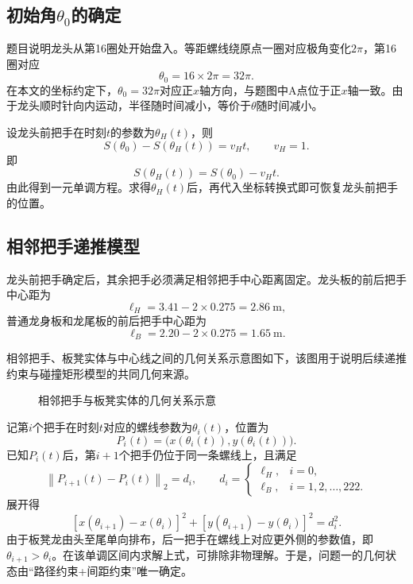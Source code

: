 \subsection{初始角$\theta_0$的确定}
题目说明龙头从第16圈处开始盘入。等距螺线绕原点一圈对应极角变化$2\pi$，第16圈对应
\[
\theta_0=16\times2\pi=32\pi.
\]
在本文的坐标约定下，$\theta_0=32\pi$对应正$x$轴方向，与题图中A点位于正$x$轴一致。由于龙头顺时针向内运动，半径随时间减小，等价于$\theta$随时间减小。

设龙头前把手在时刻$t$的参数为$\theta_H(t)$，则
\[
S(\theta_0)-S\!\left(\theta_H(t)\right)=v_H t,\qquad v_H=1.
\]
即
\[
S\!\left(\theta_H(t)\right)=S(\theta_0)-v_H t.
\]
由此得到一元单调方程。求得$\theta_H(t)$后，再代入坐标转换式即可恢复龙头前把手的位置。

\subsection{相邻把手递推模型}
龙头前把手确定后，其余把手必须满足相邻把手中心距离固定。龙头板的前后把手中心距为
\[
\ell_H=3.41-2\times0.275=2.86\ \text{m},
\]
普通龙身板和龙尾板的前后把手中心距为
\[
\ell_B=2.20-2\times0.275=1.65\ \text{m}.
\]

相邻把手、板凳实体与中心线之间的几何关系示意图如下，该图用于说明后续递推约束与碰撞矩形模型的共同几何来源。

\begin{figure}[H]
\centering
{}
\caption{相邻把手与板凳实体的几何关系示意}
\label{fig:q1-bench-geometry}
\end{figure}

记第$i$个把手在时刻$t$对应的螺线参数为$\theta_i(t)$，位置为
\[
P_i(t)=\bigl(x(\theta_i(t)),y(\theta_i(t))\bigr).
\]
已知$P_i(t)$后，第$i+1$个把手仍位于同一条螺线上，且满足
\[
\left\|P_{i+1}(t)-P_i(t)\right\|_2=d_i,
\qquad
d_i=
\begin{cases}
\ell_H, & i=0,\\
\ell_B, & i=1,2,\ldots,222.
\end{cases}
\]
展开得
\[
\left[x(\theta_{i+1})-x(\theta_i)\right]^2+
\left[y(\theta_{i+1})-y(\theta_i)\right]^2=d_i^2.
\]
由于板凳龙由头至尾单向排布，后一把手在螺线上对应更外侧的参数值，即$\theta_{i+1}>\theta_i$。在该单调区间内求解上式，可排除非物理解。于是，问题一的几何状态由“路径约束+间距约束”唯一确定。

